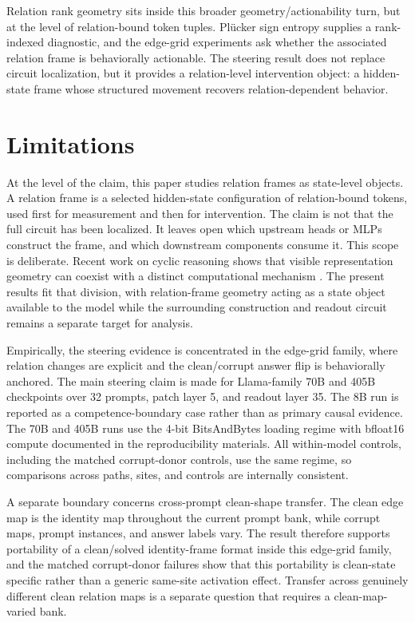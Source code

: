 \documentclass[11pt]{article}
\begin{document}
Relation rank geometry sits inside this broader geometry/actionability turn, but at the level of relation-bound token tuples. Pl\"ucker sign entropy supplies a rank-indexed diagnostic, and the edge-grid experiments ask whether the associated relation frame is behaviorally actionable. The steering result does not replace circuit localization, but it provides a relation-level intervention object: a hidden-state frame whose structured movement recovers relation-dependent behavior.

\section{Limitations}

At the level of the claim, this paper studies relation frames as state-level objects. A relation frame is a selected hidden-state configuration of relation-bound tokens, used first for measurement and then for intervention. The claim is not that the full circuit has been localized. It leaves open which upstream heads or MLPs construct the frame, and which downstream components consume it. This scope is deliberate. Recent work on cyclic reasoning shows that visible representation geometry can coexist with a distinct computational mechanism \citep{feucht2026arithmeticwild}. The present results fit that division, with relation-frame geometry acting as a state object available to the model while the surrounding construction and readout circuit remains a separate target for analysis.

Empirically, the steering evidence is concentrated in the edge-grid family, where relation changes are explicit and the clean/corrupt answer flip is behaviorally anchored. The main steering claim is made for Llama-family 70B and 405B checkpoints over 32 prompts, patch layer 5, and readout layer 35. The 8B run is reported as a competence-boundary case rather than as primary causal evidence. The 70B and 405B runs use the 4-bit BitsAndBytes loading regime with bfloat16 compute documented in the reproducibility materials. All within-model controls, including the matched corrupt-donor controls, use the same regime, so comparisons across paths, sites, and controls are internally consistent.

A separate boundary concerns cross-prompt clean-shape transfer. The clean edge map is the identity map throughout the current prompt bank, while corrupt maps, prompt instances, and answer labels vary. The result therefore supports portability of a clean/solved identity-frame format inside this edge-grid family, and the matched corrupt-donor failures show that this portability is clean-state specific rather than a generic same-site activation effect. Transfer across genuinely different clean relation maps is a separate question that requires a clean-map-varied bank.
\end{document}
